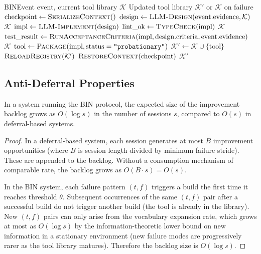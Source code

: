 \begin{algorithm}[H]
\caption{BIN-BUILD-PIPELINE$(\text{event}, \mathcal{K})$}
\label{alg:bin_build}
\begin{algorithmic}[1]
\Require BINEvent $\text{event}$, current tool library $\mathcal{K}$
\Ensure Updated tool library $\mathcal{K}'$ or $\mathcal{K}$ on failure
\State $\text{checkpoint} \gets \textsc{SerializeContext}()$
\State $\text{design} \gets \textsc{LLM-Design}(\text{event.evidence}, \mathcal{K})$
    \State \Return $\mathcal{K}$ 
\EndIf
\State $\text{impl} \gets \textsc{LLM-Implement}(\text{design})$
\State $\text{lint\_ok} \gets \textsc{TypeCheck}(\text{impl})$
    \State \Return $\mathcal{K}$
\EndIf
\State $\text{test\_result} \gets \textsc{RunAcceptanceCriteria}(\text{impl}, \text{design.criteria}, \text{event.evidence})$
    \State \Return $\mathcal{K}$
\EndIf
\State $\text{tool} \gets \textsc{Package}(\text{impl}, \text{status}=\texttt{"probationary"})$
\State $\mathcal{K}' \gets \mathcal{K} \cup \{\text{tool}\}$
\State $\textsc{ReloadRegistry}(\mathcal{K}')$
\State $\textsc{RestoreContext}(\text{checkpoint})$
\State \Return $\mathcal{K}'$
\end{algorithmic}
\end{algorithm}

\subsection{Anti-Deferral Properties}

\begin{proposition}
\label{prop:no_backlog}
In a system running the BIN protocol, the expected size of the improvement
backlog grows as $O(\log s)$ in the number of sessions $s$, compared to
$O(s)$ in deferral-based systems.
\end{proposition}

\begin{proof}
In a deferral-based system, each session generates at most $B$ improvement
opportunities (where $B$ is session length divided by minimum failure stride).
These are appended to the backlog. Without a consumption mechanism of comparable
rate, the backlog grows as $O(B \cdot s) = O(s)$.

In the BIN system, each failure pattern $(t, f)$ triggers a build the first
time it reaches threshold $\theta$. Subsequent occurrences of the same
$(t, f)$ pair after a successful build do not trigger another build (the tool
is already in the library). New $(t, f)$ pairs can only arise from the
vocabulary expansion rate, which grows at most as $O(\log s)$ by the
information-theoretic lower bound on new information in a stationary environment
(new failure modes are progressively rarer as the tool library matures).
Therefore the backlog size is $O(\log s)$.
\end{proof}

